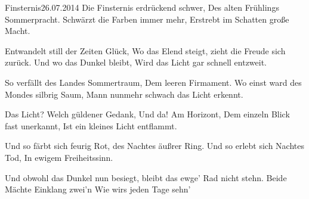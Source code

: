 \begin{poem}{Finsternis}{26.07.2014} %
Die Finsternis erdrückend schwer,
Des alten Frühlings Sommerpracht.
Schwärzt die Farben immer mehr,
Erstrebt im Schatten große Macht.

Entwandelt still der Zeiten Glück,
Wo das Elend steigt, zieht die Freude sich zurück.
Und wo das Dunkel bleibt,
Wird das Licht gar schnell entzweit.

So verfällt des Landes Sommertraum,
Dem leeren Firmament.
Wo einst ward des Mondes silbrig Saum,
Mann nunmehr schwach das Licht erkennt.

Das Licht? Welch güldener Gedank,
Und da! Am Horizont,
Dem einzeln Blick fast unerkannt,
Ist ein kleines Licht entflammt.

Und so färbt sich feurig Rot,
des Nachtes äußrer Ring.
Und so erlebt sich Nachtes Tod,
In ewigem Freiheitssinn.

Und obwohl das Dunkel nun besiegt,
bleibt das ewge' Rad nicht stehn.
Beide Mächte Einklang zwei'n
Wie wirs jeden Tage sehn'
\end{poem}